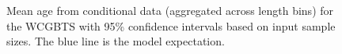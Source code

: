 \documentclass[
]{scrartcl}
\begin{document}
\begin{figure}


\caption{\label{fig-mean-age-11}Mean age from conditional data
(aggregated across length bins) for the WCGBTS with 95\% confidence
intervals based on input sample sizes. The blue line is the model
expectation.}

\end{figure}%
\end{document}
